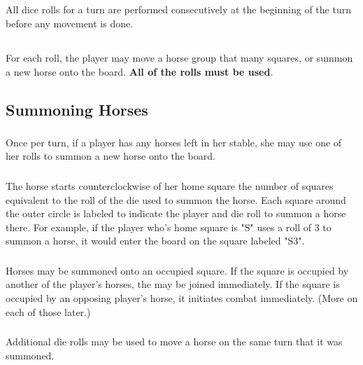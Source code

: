 \documentclass[12pt]{article} %
\begin{document}
\subsection{}
All dice rolls for a turn are performed consecutively at the beginning of the turn before any movement is done.

\subsection{}
For each roll, the player may move a horse group that many squares, or summon a new horse onto the board.  \textbf{All of the rolls must be used}.

\subsection{Summoning Horses}

\subsubsection{}
Once per turn, if a player has any horses left in her stable, she may use one of her rolls to summon a new horse onto the board.  

\subsubsection{}
The horse starts counterclockwise of her home square the number of squares equivalent to the roll of the die used to summon the horse.  Each square around the outer circle is labeled to indicate the player and die roll to summon a horse there.  For example, if the player who's home square is "S" uses a roll of 3 to summon a horse, it would enter the board on the square labeled "S3".

\subsubsection{}
Horses may be summoned onto an occupied square.   If the square is occupied by another of the player's horses, the may be joined immediately.  If the square is occupied by an opposing player's horse, it initiates combat immediately.  (More on each of those later.)

\subsubsection{}
Additional die rolls may be used to move a horse on the same turn that it was summoned.
\end{document}
